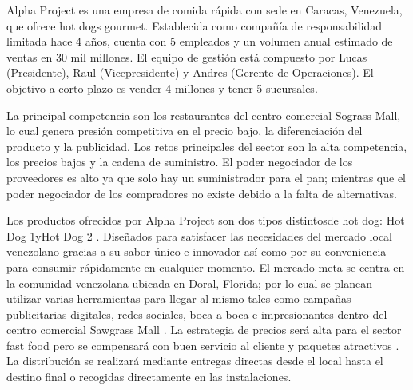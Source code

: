 

Alpha Project es una empresa de comida rápida con sede en Caracas, Venezuela, que ofrece hot dogs gourmet. Establecida como compañía de responsabilidad limitada hace 4 años, cuenta con 5 empleados y un volumen anual estimado de ventas en 30 mil millones. El equipo de gestión está compuesto por Lucas (Presidente), Raul (Vicepresidente) y Andres (Gerente de Operaciones). El objetivo a corto plazo es vender 4 millones y tener 5 sucursales. 

La principal competencia son los restaurantes del centro comercial Sograss Mall, lo cual genera presión competitiva en el precio bajo, la diferenciación del producto y la publicidad. Los retos principales del sector son la alta competencia, los precios bajos y la cadena de suministro. El poder negociador de los proveedores es alto ya que solo hay un suministrador para el pan; mientras que el poder negociador de los compradores no existe debido a la falta de alternativas. 

Los productos ofrecidos por Alpha Project son dos tipos distintosde hot dog: Hot Dog 1yHot Dog 2 . Diseñados para satisfacer las necesidades del mercado local venezolano gracias a su sabor único e innovador así como por su conveniencia para consumir rápidamente en cualquier momento. El mercado meta se centra en la comunidad venezolana ubicada en Doral, Florida; por lo cual se planean utilizar varias herramientas para llegar al mismo tales como campañas publicitarias digitales, redes sociales, boca a boca e impresionantes dentro del centro comercial Sawgrass Mall . La estrategia de precios será alta para el sector fast food pero se compensará con buen servicio al cliente y paquetes atractivos . La distribución se realizará mediante entregas directas desde el local hasta el destino final o recogidas directamente en las instalaciones.